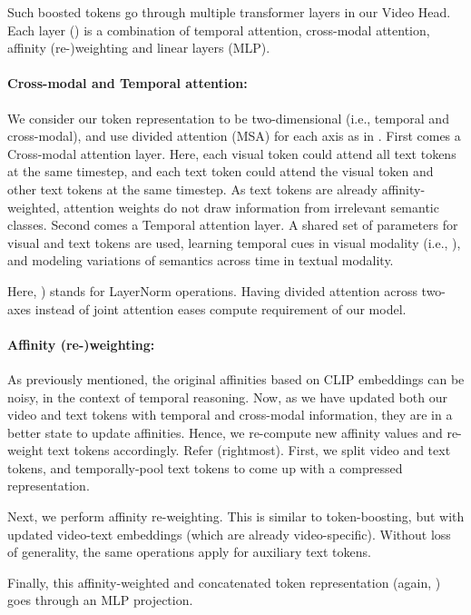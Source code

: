 \documentclass[10pt,twocolumn,letterpaper]{article}
\begin{document}
Such boosted tokens  go through multiple transformer layers in our Video Head. Each layer () is a combination of temporal attention, cross-modal attention, affinity (re-)weighting and linear layers (MLP).

\paragraph{Cross-modal and Temporal attention:}
We consider our token representation to be two-dimensional (i.e., temporal and cross-modal), and use divided attention (MSA) for each axis as in \cite{arnab2021vivit, bertasius2021timesformer}. First comes a Cross-modal attention layer. Here, each visual token could attend all text tokens at the same timestep, and each text token could attend the visual token and other text tokens at the same timestep. As text tokens are already affinity-weighted, attention weights do not draw information from irrelevant semantic classes. Second comes a Temporal attention layer. A shared set of parameters for visual and text tokens are used, learning temporal cues in visual modality (i.e., ), and modeling variations of semantics across time in textual modality. 

Here, ) stands for LayerNorm operations. Having divided attention across two-axes instead of joint attention eases compute requirement of our model.

\paragraph{Affinity (re-)weighting:}
As previously mentioned, the original affinities based on CLIP embeddings can be noisy, in the context of temporal reasoning. Now, as we have updated both our video and text tokens with temporal and cross-modal information, they are in a better state to update affinities. Hence, we re-compute new affinity values and re-weight text tokens accordingly. Refer  (rightmost). First, we split video and text tokens, and temporally-pool text tokens to come up with a compressed representation.

Next, we perform affinity re-weighting. This is similar to token-boosting, but with updated video-text embeddings (which are already video-specific). Without loss of generality, the same operations apply for auxiliary text tokens.


Finally, this affinity-weighted and concatenated token representation (again, ) goes through an MLP projection.
\end{document}
